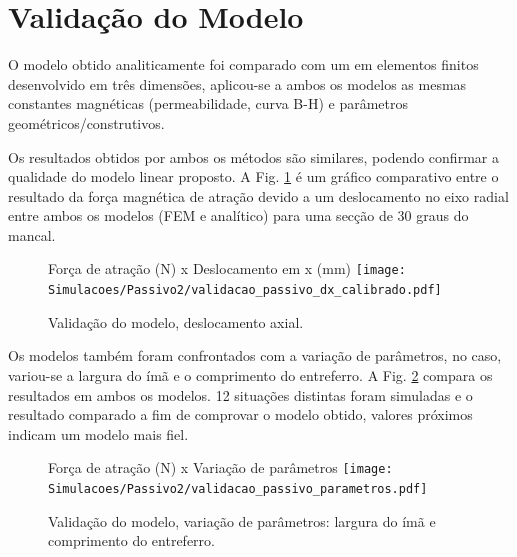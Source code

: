 %

\section{Validação do Modelo}

O modelo obtido analiticamente foi comparado com um em elementos finitos desenvolvido em três dimensões, aplicou-se a ambos os modelos as mesmas constantes magnéticas (permeabilidade, curva B-H) e parâmetros geométricos/construtivos.

Os resultados obtidos por ambos os métodos são similares, podendo confirmar a qualidade do modelo linear proposto.  A Fig. \ref{fig:validacao_passivo_dx_calibrado} é um gráfico comparativo entre o resultado da força magnética de atração devido a um deslocamento no eixo radial entre ambos os modelos (FEM e analítico) para uma secção de 30 graus do mancal.

\begin{figure}[th!]
	\centering
	Força de atração (N) x Deslocamento em x (mm)
	\texttt{[image: Simulacoes/Passivo2/validacao\_passivo\_dx\_calibrado.pdf]}
	\caption{Validação do modelo, deslocamento axial.}
	\label{fig:validacao_passivo_dx_calibrado}
\end{figure}

Os modelos também foram confrontados com a variação de parâmetros, no caso, variou-se a largura do ímã e o comprimento do entreferro. A Fig. \ref{fig:validacao_passivo_parametros} compara os resultados em ambos os modelos. 12 situações distintas foram simuladas e o resultado comparado a fim de comprovar o modelo obtido, valores próximos indicam um modelo mais fiel.  

\begin{figure}[th!]
	\centering
	Força de atração (N) x Variação de parâmetros
	\texttt{[image: Simulacoes/Passivo2/validacao\_passivo\_parametros.pdf]}
	\caption{Validação do modelo, variação de parâmetros: largura do ímã e comprimento do entreferro.}
	\label{fig:validacao_passivo_parametros}
\end{figure} 

